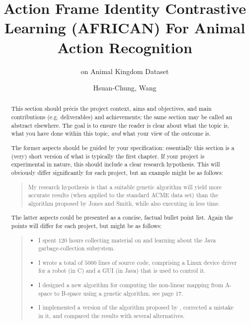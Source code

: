 \documentclass[
]{uob-thesis}
\title{Action Frame Identity Contrastive Learning (AFRICAN) For Animal Action Recognition} %
\subtitle{ on Animal Kingdom Dataset} %
\author{Hsuan-Chung, Wang}
\date{\printdatewithoutmonth{thesisdate}}
\begin{document}

\maketitle
\cleardoubleoddemptypage

\begin{abstract} %


  This section should pr\'{e}cis the project context, aims and objectives,
  and main contributions (e.g. deliverables) and achievements; the same 
  section may be called an abstract elsewhere.  The goal is to ensure the 
  reader is clear about what the topic is, what you have done within this 
  topic, \emph{and} what your view of the outcome is.

  The former aspects should be guided by your specification: essentially 
  this section is a (very) short version of what is typically the first 
  chapter. If your project is experimental in nature, this should include 
  a clear research hypothesis.  This will obviously differ significantly
  for each project, but an example might be as follows:

  \begin{quote}
    My research hypothesis is that a suitable genetic algorithm will yield
    more accurate results (when applied to the standard ACME data set) than 
    the algorithm proposed by Jones and Smith, while also executing in less
    time.
  \end{quote}

  The latter aspects could be presented as a concise, factual bullet point list.
  Again the points will differ for each project, but might be as follows:

  \begin{quote}
    \begin{itemize}
    \item I spent $120$ hours collecting material on and learning about the Java
      garbage-collection subsystem. 
    \item I wrote a total of $5000$ lines of source code, comprising a Linux
      device driver for a robot (in C) and a GUI (in Java) that is used to
      control it.
    \item I designed a new algorithm for computing the non-linear mapping from
      A-space to B-space using a genetic algorithm, see page $17$.
    \item I implemented a version of the algorithm proposed by
      \textcite{qian2021}, corrected a mistake in it, and compared the results
      with several alternatives.
    \end{itemize}
  \end{quote}
\end{abstract}
\end{document}
